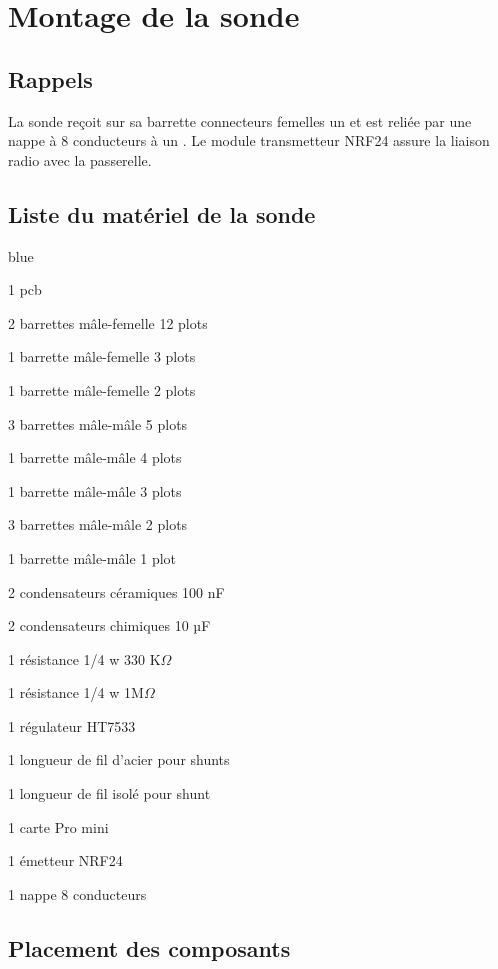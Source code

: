 
\chapter{Montage de la sonde}


\section{Rappels}


La sonde reçoit sur sa barrette connecteurs femelles un  et est reliée par une nappe à 8 conducteurs à un .
Le module transmetteur NRF24 assure la liaison radio avec la passerelle. 

\section{Liste du matériel de la sonde}

\begin{items}{blue}{\Triangle}
\item 1 pcb
\item 2 barrettes mâle-femelle 12 plots		
\item 1 barrette mâle-femelle 3 plots	
\item 1 barrette mâle-femelle 2 plots	
\item 3 barrettes mâle-mâle 5 plots		
\item 1 barrette mâle-mâle 4 plots		
\item 1 barrette mâle-mâle 3 plots		
\item 3 barrettes mâle-mâle 2 plots		
\item 1 barrette mâle-mâle 1 plot		
\item 2 condensateurs céramiques 100 nF
\item 2 condensateurs chimiques    10 µF
\item 1 résistance 1/4 w  330 K$\Omega$
\item 1 résistance 1/4 w 1M$\Omega$
\item 1 régulateur HT7533
\item 1 longueur de fil d'acier pour shunts
\item 1 longueur de fil isolé pour shunt
\item 1 carte Pro mini
\item 1 émetteur NRF24
\item 1 nappe 8 conducteurs
\end{items}

\section{Placement des composants}

